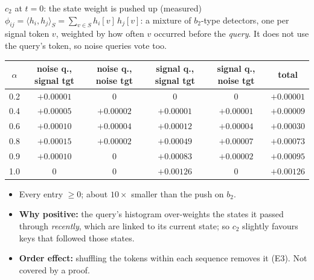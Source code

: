 \begin{frame}{$c_2$ at $t=0$: the state weight is pushed up (measured)}
\small
$\phi_{ij}=\langle h_i,h_j\rangle_S=\sum_{v\in S}h_i[v]\,h_j[v]$: a mixture of $b_2$-type detectors, one per signal token $v$,
weighted by how often $v$ occurred before the \emph{query}. It does not use the query's token, so noise queries vote too.
\begin{center}\footnotesize
\begin{tabular}{cccccc}\toprule
$\alpha$ & noise q., signal tgt & noise q., noise tgt & signal q., signal tgt & signal q., noise tgt & total\\\midrule
0.2 & $+0.00001$ & $0$ & $0$ & $0$ & $+0.00001$\\
0.4 & $+0.00005$ & $+0.00002$ & $+0.00001$ & $+0.00001$ & $+0.00009$\\
0.6 & $+0.00010$ & $+0.00004$ & $+0.00012$ & $+0.00004$ & $+0.00030$\\
0.8 & $+0.00015$ & $+0.00002$ & $+0.00049$ & $+0.00007$ & $+0.00073$\\
0.9 & $+0.00010$ & $0$ & $+0.00083$ & $+0.00002$ & $+0.00095$\\
1.0 & $0$ & $0$ & $+0.00126$ & $0$ & $+0.00126$\\\bottomrule
\end{tabular}
\end{center}
\begin{itemize}
\item Every entry $\ge0$; about $10\times$ smaller than the push on $b_2$.
\item \textbf{Why positive:} the query's histogram over-weights the states it passed through \emph{recently}, which are linked to its
current state; so $c_2$ slightly favours keys that followed those states.
\item \textbf{Order effect:} shuffling the tokens within each sequence removes it (E3). Not covered by a proof.
\end{itemize}
\end{frame}

